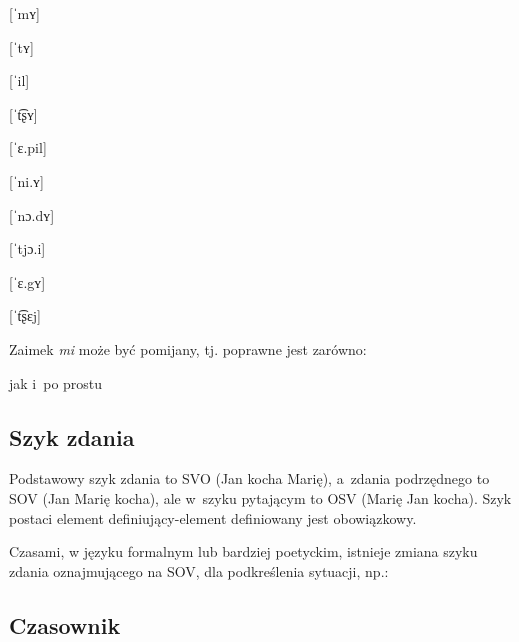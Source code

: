 \begin{spacing}{1.1}
\begin{multicols}{2}
[ˈmʏ]

[ˈtʏ]


[ˈil]

[ˈt͡ʂʏ]

[ˈɛ.pil]

[ˈni.ʏ]

[ˈnɔ.dʏ]

[ˈtjɔ.i]

[ˈɛ.gʏ]

[ˈt͡ʂɛj]

\end{multicols}

\noindent
Zaimek \emph{mi} może być pomijany, tj. poprawne jest zarówno: 


\noindent
jak i~po prostu


\subsection{Szyk zdania}

Podstawowy szyk zdania to SVO (Jan kocha Marię), a~zdania podrzędnego to SOV
(Jan Marię kocha), ale w~szyku pytającym to OSV (Marię Jan kocha). Szyk postaci
element definiujący-element definiowany jest obowiązkowy.

Czasami, w języku formalnym lub bardziej poetyckim, istnieje zmiana szyku zdania
oznajmującego na SOV, dla podkreślenia sytuacji, np.:


\subsection{Czasownik}


\end{spacing}

